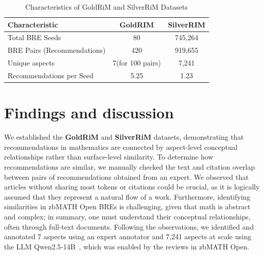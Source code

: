 \documentclass[sigconf,anonymous]{acmart}
\begin{document}
\begin{table}[h]
\centering
\caption{Characteristics of GoldRiM and SilverRiM Datasets}
\label{tab:dataset_characteristics}
\begin{tabular}{lcc}
\hline
\textbf{Characteristic} & \textbf{GoldRIM} & \textbf{SilverRIM} \\
\hline
Total BRE Seeds & 80 & 745,264 \\
BRE Pairs (Recommendations) & 420 & 919,655 \\
Unique aspects & 7(for 100 pairs) & 7,241 \\
Recommendations per Seed & 5.25 & 1.23 \\
\hline
\end{tabular}
\end{table}

\section{Findings and discussion}

We established the \textbf{GoldRiM} and \textbf{SilverRiM} datasets, demonstrating that recommendations in mathematics are connected by aspect-level conceptual relationships rather than surface-level similarity.
To determine how recommendations are similar, we manually checked the text and citation overlap between pairs of recommendations obtained from an expert. 
We observed that articles without sharing most tokens or citations could be crucial, as it is logically assumed that they represent a natural flow of a work.
Furthermore, identifying similarities in zbMATH Open BREs is challenging, given that math is abstract and complex; in summary, one must understand their conceptual relationships, often through full-text documents.
Following the observations, we identified and annotated 7 aspects using an expert annotator and 7,241 aspects at scale using the LLM Qwen2.5-14B~\cite{qwen2025qwen25technicalreport}, which was enabled by the reviews in zbMATH Open.
\end{document}
